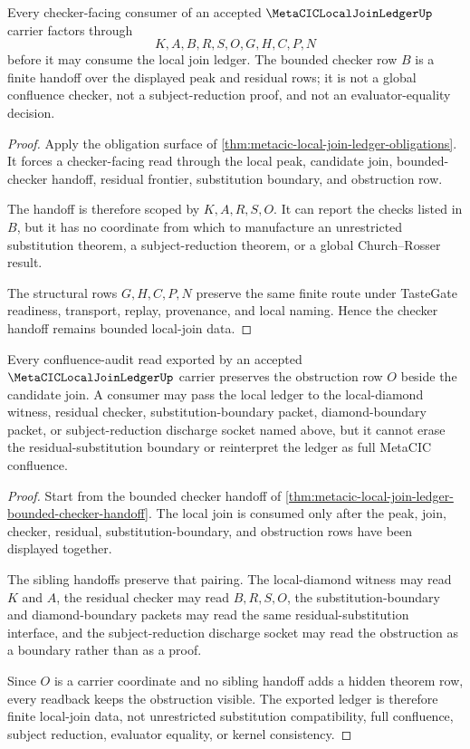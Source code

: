 \begin{theorem}
\label{thm:metacic-local-join-ledger-bounded-checker-handoff}
Every checker-facing consumer of an accepted $\MetaCICLocalJoinLedgerUp$ carrier factors through
$$
K,A,B,R,S,O,G,H,C,P,N
$$
before it may consume the local join ledger. The bounded checker row $B$ is a finite handoff over the displayed peak and residual rows; it is not a global confluence checker, not a subject-reduction proof, and not an evaluator-equality decision.
\end{theorem}
\begin{proof}
Apply the obligation surface of \autoref{thm:metacic-local-join-ledger-obligations}. It forces a checker-facing read through the local peak, candidate join, bounded-checker handoff, residual frontier, substitution boundary, and obstruction row.

The handoff is therefore scoped by $K,A,R,S,O$. It can report the checks listed in $B$, but it has no coordinate from which to manufacture an unrestricted substitution theorem, a subject-reduction theorem, or a global Church--Rosser result.

The structural rows $G,H,C,P,N$ preserve the same finite route under TasteGate readiness, transport, replay, provenance, and local naming. Hence the checker handoff remains bounded local-join data.
\end{proof}

\begin{theorem}
\label{thm:metacic-local-join-ledger-obstruction-preserving-readback}
Every confluence-audit read exported by an accepted $\MetaCICLocalJoinLedgerUp$ carrier preserves the obstruction row $O$ beside the candidate join. A consumer may pass the local ledger to the local-diamond witness, residual checker, substitution-boundary packet, diamond-boundary packet, or subject-reduction discharge socket named above, but it cannot erase the residual-substitution boundary or reinterpret the ledger as full MetaCIC confluence.
\end{theorem}
\begin{proof}
Start from the bounded checker handoff of \autoref{thm:metacic-local-join-ledger-bounded-checker-handoff}. The local join is consumed only after the peak, join, checker, residual, substitution-boundary, and obstruction rows have been displayed together.

The sibling handoffs preserve that pairing. The local-diamond witness may read $K$ and $A$, the residual checker may read $B,R,S,O$, the substitution-boundary and diamond-boundary packets may read the same residual-substitution interface, and the subject-reduction discharge socket may read the obstruction as a boundary rather than as a proof.

Since $O$ is a carrier coordinate and no sibling handoff adds a hidden theorem row, every readback keeps the obstruction visible. The exported ledger is therefore finite local-join data, not unrestricted substitution compatibility, full confluence, subject reduction, evaluator equality, or kernel consistency.
\end{proof}

